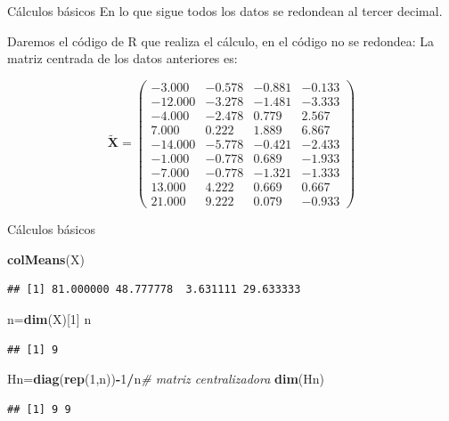 \documentclass[
  ignorenonframetext,
]{beamer}
\newenvironment{Shaded}{\begin{snugshade}}{\end{snugshade}}
\newcommand{\CommentTok}[1]{\textcolor[rgb]{0.56,0.35,0.01}{\textit{#1}}}
\newcommand{\DecValTok}[1]{\textcolor[rgb]{0.00,0.00,0.81}{#1}}
\newcommand{\FunctionTok}[1]{\textcolor[rgb]{0.13,0.29,0.53}{\textbf{#1}}}
\newcommand{\NormalTok}[1]{#1}
\newcommand{\OtherTok}[1]{\textcolor[rgb]{0.56,0.35,0.01}{#1}}
\newcommand{\SpecialCharTok}[1]{\textcolor[rgb]{0.81,0.36,0.00}{\textbf{#1}}}
\begin{document}
\begin{frame}{Cálculos básicos}
\label{cuxe1lculos-buxe1sicos}
En lo que sigue todos los datos se redondean al tercer decimal.

Daremos el código de R que realiza el cálculo, en el código no se
redondea: La matriz centrada de los datos anteriores es:

\[
\tilde{\mathbf{X}}=
\left(
\begin{array}{rrrr}
-3.000 & -0.578 & -0.881 & -0.133 \\
-12.000 & -3.278 & -1.481 & -3.333 \\
-4.000 & -2.478 & 0.779 & 2.567 \\
7.000 & 0.222 & 1.889 & 6.867 \\
-14.000 & -5.778 & -0.421 & -2.433 \\
-1.000 & -0.778 & 0.689 & -1.933 \\
-7.000 & -0.778 & -1.321 & -1.333 \\
13.000 & 4.222 & 0.669 & 0.667 \\
21.000 & 9.222 & 0.079 & -0.933
\end{array}
\right)
\]
\end{frame}

\begin{frame}[fragile]{Cálculos básicos}
\label{cuxe1lculos-buxe1sicos-1}
\begin{Shaded}
\begin{Highlighting}[]
\FunctionTok{colMeans}\NormalTok{(X)}
\end{Highlighting}
\end{Shaded}

\begin{verbatim}
## [1] 81.000000 48.777778  3.631111 29.633333
\end{verbatim}

\begin{Shaded}
\begin{Highlighting}[]
\NormalTok{n}\OtherTok{=}\FunctionTok{dim}\NormalTok{(X)[}\DecValTok{1}\NormalTok{]}
\NormalTok{n}
\end{Highlighting}
\end{Shaded}

\begin{verbatim}
## [1] 9
\end{verbatim}

\begin{Shaded}
\begin{Highlighting}[]
\NormalTok{Hn}\OtherTok{=}\FunctionTok{diag}\NormalTok{(}\FunctionTok{rep}\NormalTok{(}\DecValTok{1}\NormalTok{,n))}\SpecialCharTok{{-}}\DecValTok{1}\SpecialCharTok{/}\NormalTok{n}\CommentTok{\# matriz centralizadora}
\FunctionTok{dim}\NormalTok{(Hn)}
\end{Highlighting}
\end{Shaded}

\begin{verbatim}
## [1] 9 9
\end{verbatim}
\end{frame}
\end{document}
